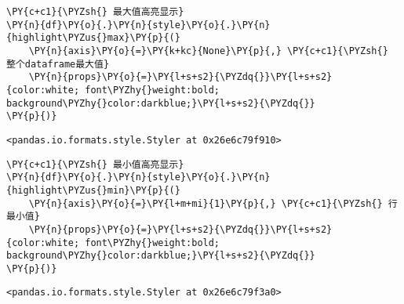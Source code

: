     \begin{tcolorbox}[breakable, size=fbox, boxrule=1pt, pad at break*=1mm,colback=cellbackground, colframe=cellborder]
\begin{Verbatim}[commandchars=\\\{\}]
\PY{c+c1}{\PYZsh{} 最大值高亮显示}
\PY{n}{df}\PY{o}{.}\PY{n}{style}\PY{o}{.}\PY{n}{highlight\PYZus{}max}\PY{p}{(}
    \PY{n}{axis}\PY{o}{=}\PY{k+kc}{None}\PY{p}{,} \PY{c+c1}{\PYZsh{} 整个dataframe最大值}
    \PY{n}{props}\PY{o}{=}\PY{l+s+s2}{\PYZdq{}}\PY{l+s+s2}{color:white; font\PYZhy{}weight:bold; background\PYZhy{}color:darkblue;}\PY{l+s+s2}{\PYZdq{}}
\PY{p}{)}
\end{Verbatim}
\end{tcolorbox}

            \begin{tcolorbox}[breakable, size=fbox, boxrule=.5pt, pad at break*=1mm, opacityfill=0]
\begin{Verbatim}[commandchars=\\\{\}]
<pandas.io.formats.style.Styler at 0x26e6c79f910>
\end{Verbatim}
\end{tcolorbox}
        
    \begin{tcolorbox}[breakable, size=fbox, boxrule=1pt, pad at break*=1mm,colback=cellbackground, colframe=cellborder]
\begin{Verbatim}[commandchars=\\\{\}]
\PY{c+c1}{\PYZsh{} 最小值高亮显示}
\PY{n}{df}\PY{o}{.}\PY{n}{style}\PY{o}{.}\PY{n}{highlight\PYZus{}min}\PY{p}{(}
    \PY{n}{axis}\PY{o}{=}\PY{l+m+mi}{1}\PY{p}{,} \PY{c+c1}{\PYZsh{} 行最小值}
    \PY{n}{props}\PY{o}{=}\PY{l+s+s2}{\PYZdq{}}\PY{l+s+s2}{color:white; font\PYZhy{}weight:bold; background\PYZhy{}color:darkblue;}\PY{l+s+s2}{\PYZdq{}}
\PY{p}{)}
\end{Verbatim}
\end{tcolorbox}

            \begin{tcolorbox}[breakable, size=fbox, boxrule=.5pt, pad at break*=1mm, opacityfill=0]
\begin{Verbatim}[commandchars=\\\{\}]
<pandas.io.formats.style.Styler at 0x26e6c79f3a0>
\end{Verbatim}
\end{tcolorbox}
        
